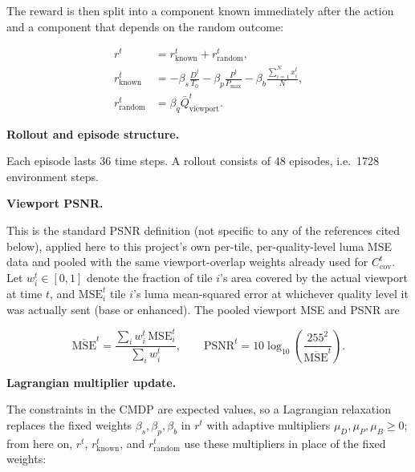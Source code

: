 \documentclass[10pt,conference,a4paper]{IEEEtran}
\newcommand{\head}[1]{%
    \vspace{2pt}
    \noindent
    \textbf{#1}
    \hspace{2pt}
}
\begin{document}

The reward is then split into a component known immediately after the
action and a component that depends on the random outcome:

\begin{align}
r^t
&=
r_{\mathrm{known}}^t
+
r_{\mathrm{random}}^t,
\\
r_{\mathrm{known}}^t
&=
-\beta_s\frac{D^t}{T_0}
-\beta_p\frac{P^t}{P_{\max}}
-\beta_b
\frac{
\sum_{i=1}^{N}x_i^t
}{
N
},
\\
r_{\mathrm{random}}^t
&=
\beta_q
\bar Q_{\mathrm{viewport}}^t.
\end{align}


\head{Rollout and episode structure.}
Each episode lasts 36 time steps. A rollout consists of 48
episodes, i.e.\ 1728 environment steps.


\head{Viewport PSNR.}
This is the standard PSNR definition (not specific to any of the
references cited below), applied here to this project's own
per-tile, per-quality-level luma MSE data and pooled with the
same viewport-overlap weights already used for
$C_{\mathrm{cov}}^t$. Let $w_i^t\in[0,1]$ denote the fraction of
tile $i$'s area covered by the actual viewport at time $t$, and
$\mathrm{MSE}_i^t$ tile $i$'s luma mean-squared error at whichever
quality level it was actually sent (base or enhanced). The pooled
viewport MSE and PSNR are

\begin{equation}
\overline{\mathrm{MSE}}^t
=
\frac{\sum_i w_i^t\,\mathrm{MSE}_i^t}{\sum_i w_i^t},
\qquad
\mathrm{PSNR}^t
=
10\log_{10}
\!\left(
\frac{255^2}{\overline{\mathrm{MSE}}^t}
\right).
\end{equation}

\head{Lagrangian multiplier update.}
The constraints in the CMDP are expected values, so a Lagrangian
relaxation replaces the fixed weights $\beta_s,\beta_p,\beta_b$ in
$r^t$ with adaptive multipliers $\mu_D,\mu_P,\mu_B\geq0$; from here
on, $r^t$, $r_{\mathrm{known}}^t$, and $r_{\mathrm{random}}^t$ use
these multipliers in place of the fixed weights:
\end{document}
